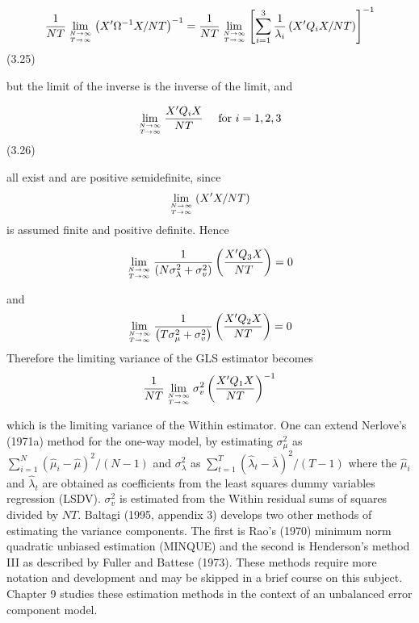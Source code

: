 \documentclass[
]{book}
\begin{document}
\begin{equation}
\frac{1}{N T} \lim _{N \rightarrow \infty \atop T \rightarrow \infty}\left(X^{\prime} \Omega^{-1} X / N T\right)^{-1}=\frac{1}{N T} \lim _{N \rightarrow \infty \atop T \rightarrow \infty}\left[\sum_{i=1}^{3} \frac{1}{\lambda_{i}}\left(X^{\prime} Q_{i} X / N T\right)\right]^{-1}
\end{equation} (3.25)

but the limit of the inverse is the inverse of the limit, and

\begin{equation}
\lim _{N \rightarrow \infty \atop T \rightarrow \infty} \frac{X^{\prime} Q_{i} X}{N T} \quad \text { for } i=1,2,3
\end{equation} (3.26)

all exist and are positive semidefinite, since \[\lim _{N \rightarrow \infty \atop T \rightarrow \infty}\left(X^{\prime} X / N T\right)\] is assumed finite and positive definite. Hence

\[
\lim _{N \rightarrow \infty \atop T \rightarrow \infty} \frac{1}{\left(N \sigma_{\lambda}^{2}+\sigma_{v}^{2}\right)}\left(\frac{X^{\prime} Q_{3} X}{N T}\right)=0
\]

and
\[
\lim _{N \rightarrow \infty \atop T \rightarrow \infty} \frac{1}{\left(T \sigma_{\mu}^{2}+\sigma_{v}^{2}\right)}\left(\frac{X^{\prime} Q_{2} X}{N T}\right)=0
\]
Therefore the limiting variance of the GLS estimator becomes
\[
\frac{1}{N T} \lim _{N \rightarrow \infty \atop T \rightarrow \infty} \sigma_{v}^{2}\left(\frac{X^{\prime} Q_{1} X}{N T}\right)^{-1}
\]

which is the limiting variance of the Within estimator. One can extend Nerlove's (1971a) method for the one-way model, by estimating \(\sigma_{\mu}^{2}\) as \(\sum_{i=1}^{N}\left(\widehat{\mu}_{i}-\widehat{\mu}\right)^{2} /(N-1)\) and \(\sigma_{\lambda}^{2}\) as \(\sum_{t=1}^{T}\left(\widehat{\lambda}_{t}-\bar{\lambda}\right)^{2} /(T-1)\) where the \(\widehat{\mu}_{i}\) and \(\widehat{\lambda}_{t}\) are obtained
as coefficients from the least squares dummy variables regression (LSDV). \(\sigma_{v}^{2}\) is estimated from the Within residual sums of squares divided by \(N T\). Baltagi (1995, appendix 3) develops two other methods of estimating the variance components. The first is Rao's (1970) minimum norm quadratic unbiased estimation (MINQUE) and the second is Henderson's method III as described by Fuller and Battese (1973). These methods require more notation and development and may be skipped in a brief course on this subject. Chapter 9 studies these estimation methods in the context of an unbalanced error component model.
\end{document}
